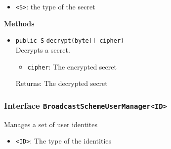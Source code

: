 \begin{itemize}
\item \lstinline|<S>|: the type of the secret
\end{itemize}



\textbf{Methods}
\begin{itemize}
\item \lstinline|public S| \lstinline|decrypt|\lstinline|(byte[] cipher)|\\
Decrypts a secret.
\begin{itemize}
\item \lstinline|cipher|: The encrypted secret
\end{itemize}

Returns: The decrypted secret

\end{itemize}

\subsubsection{Interface \lstinline|BroadcastSchemeUserManager<ID>|}
Manages a set of user identites \\



\begin{itemize}
\item \lstinline|<ID>|: The type of the identities
\end{itemize}



